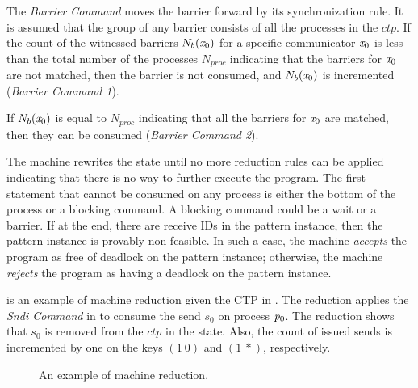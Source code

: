 The \emph{Barrier Command} moves the barrier forward by its synchronization rule. It is assumed that the group of any barrier consists of all the processes in the $\mathit{ctp}$. 
If the count of the witnessed barriers $\textit{$N_b$}(\mathit{x}_0)$ for a specific communicator $\mathit{x}_0$ is less than the total number of the processes $N_{proc}$ indicating that the barriers for $\mathit{x}_0$ are not matched, then the barrier is not consumed, and $\textit{$N_b$}(\mathit{x}_0)$ is incremented (\emph{Barrier Command 1}). 

If $\textit{$N_b$}(\mathit{x}_0)$ is equal to $N_{proc}$ indicating that all the barriers for $\mathit{x}_0$ are matched, then they can be consumed (\emph{Barrier Command 2}).

The machine rewrites the state until no more reduction rules can be applied indicating that there is no way to further execute the program. The first statement that cannot be consumed on any process is either the bottom of the process or a blocking command. A blocking command could be a wait or a barrier. If at the end, there are receive IDs in the pattern instance, then the pattern instance is provably non-feasible. In such a case, the machine \emph{accepts} the program as free of deadlock on the pattern instance; otherwise, the machine \emph{rejects} the program as having a deadlock on the pattern instance.

 is an example of machine reduction given the CTP in . The reduction applies the \emph{Sndi Command} in  to consume the send $s_0$ on process $\mathit{p}_0$. The reduction shows that $s_0$ is removed from the $ctp$ in the state. Also, the count of issued sends is incremented by one on the keys $(1\ 0)$ and $(1\ \ast)$, respectively.

\begin{figure*}[tb]
\centering
{}
\caption{An example of machine reduction. }
\label{fig:machineexample}
\end{figure*}

